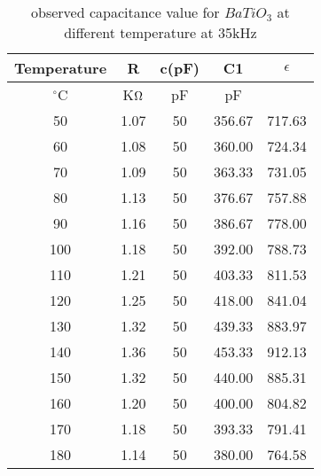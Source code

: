 \begin{table}[H]
    \centering
    \begin{tabular}{|c|c|c|c|c|}
        \hline
        Temperature & R       & c(pF) & C1     & $\epsilon$ \\ \hline
        $^{\circ}$C & K$\ohm$ & pF    & pF     & ~          \\ \hline
        50          & 1.07    & 50    & 356.67 & 717.63     \\ \hline
        60          & 1.08    & 50    & 360.00 & 724.34     \\ \hline
        70          & 1.09    & 50    & 363.33 & 731.05     \\ \hline
        80          & 1.13    & 50    & 376.67 & 757.88     \\ \hline
        90          & 1.16    & 50    & 386.67 & 778.00     \\ \hline
        100         & 1.18    & 50    & 392.00 & 788.73     \\ \hline
        110         & 1.21    & 50    & 403.33 & 811.53     \\ \hline
        120         & 1.25    & 50    & 418.00 & 841.04     \\ \hline
        130         & 1.32    & 50    & 439.33 & 883.97     \\ \hline
        140         & 1.36    & 50    & 453.33 & 912.13     \\ \hline
        150         & 1.32    & 50    & 440.00 & 885.31     \\ \hline
        160         & 1.20    & 50    & 400.00 & 804.82     \\ \hline
        170         & 1.18    & 50    & 393.33 & 791.41     \\ \hline
        180         & 1.14    & 50    & 380.00 & 764.58     \\ \hline
    \end{tabular}
    \caption{observed capacitance value for $BaTiO_3$ at different temperature at 35kHz}
    \label{tab:7}
\end{table}